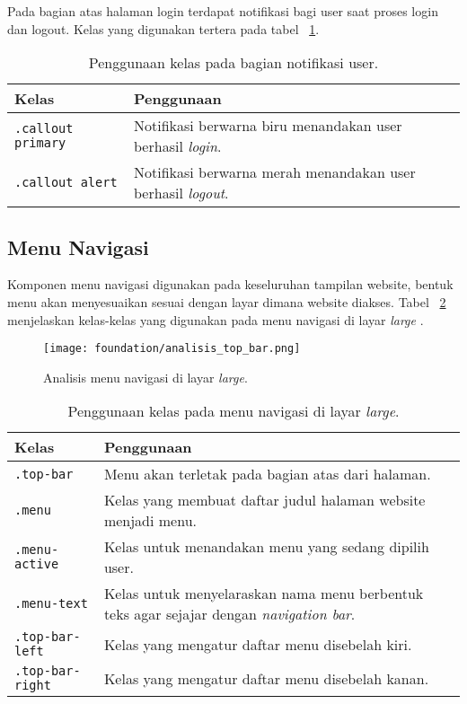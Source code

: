 Pada bagian atas halaman login terdapat notifikasi bagi user saat proses login dan logout. Kelas yang digunakan tertera pada tabel ~\ref{table:notifikasiUser}.\\

\begin{table}[H]
	\centering
	\caption{Penggunaan kelas pada bagian notifikasi user.}
	\begin{tabularx}{\textwidth}{lX}
		\toprule
		Kelas     & Penggunaan \\
		\midrule
		\texttt{.callout primary} & Notifikasi berwarna biru menandakan user berhasil \textit{login}.\\
		\texttt{.callout alert} & Notifikasi berwarna merah menandakan user berhasil \textit{logout}.\\
		\bottomrule
	\end{tabularx}%
	\label{table:notifikasiUser}
\end{table}%


\subsection{Menu Navigasi}
Komponen menu navigasi digunakan pada keseluruhan tampilan website, bentuk menu akan menyesuaikan sesuai dengan layar dimana website diakses. Tabel ~\ref{table:navigasiLarge} menjelaskan kelas-kelas yang digunakan pada menu navigasi di layar \textit{large} .\\

\begin{figure} [H]
	\centering  
	\texttt{[image: foundation/analisis\_top\_bar.png]}  
	\caption{Analisis menu navigasi di layar \textit{large}.} 
	\label{fig:navigasiLarge}
\end{figure}

\begin{table}[H]
	\centering
	\caption{Penggunaan kelas pada menu navigasi di layar \textit{large}.}
	\begin{tabularx}{\textwidth}{lX}
		\toprule
		Kelas     & Penggunaan \\
		\midrule
		\texttt{.top-bar}	 & Menu akan terletak pada bagian atas dari halaman.\\	
		\texttt{.menu}	 & Kelas yang membuat daftar judul halaman website menjadi menu.\\
		\texttt{.menu-active} & Kelas untuk menandakan menu yang sedang dipilih user.\\
		\texttt{.menu-text} & Kelas untuk menyelaraskan nama menu berbentuk teks agar sejajar dengan \textit{navigation bar}.\\	
		\texttt{.top-bar-left} & Kelas yang mengatur daftar menu disebelah kiri.\\
		\texttt{.top-bar-right} & Kelas yang mengatur daftar menu disebelah kanan.\\
		\bottomrule
	\end{tabularx}%
	\label{table:navigasiLarge}
\end{table}%

